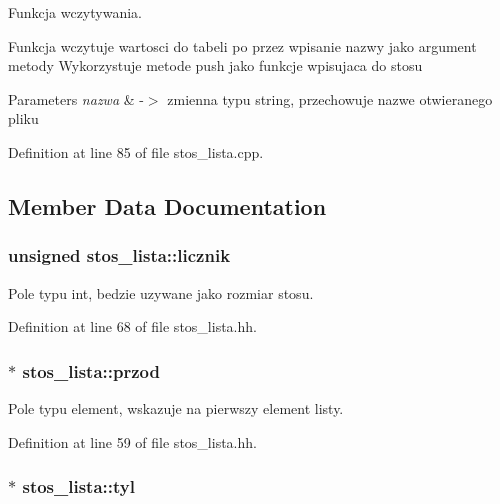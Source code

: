 Funkcja wczytywania. 

Funkcja wczytuje wartosci do tabeli po przez wpisanie nazwy jako argument metody Wykorzystuje metode push jako funkcje wpisujaca do stosu


\begin{DoxyParams}{Parameters}
{\em nazwa} & -\/$>$ zmienna typu string, przechowuje nazwe otwieranego pliku \\
\hline
\end{DoxyParams}


Definition at line 85 of file stos\-\_\-lista.\-cpp.



\subsection{Member Data Documentation}
\hypertarget{classstos__lista_ab9d47f55d1288d44e0b58fcea281925f}{
\subsubsection[{licznik}]{\setlength{\rightskip}{0pt plus 5cm}unsigned stos\-\_\-lista\-::licznik\hspace{0.3cm}{\ttfamily [private]}}}\label{classstos__lista_ab9d47f55d1288d44e0b58fcea281925f}


Pole typu int, bedzie uzywane jako rozmiar stosu. 



Definition at line 68 of file stos\-\_\-lista.\-hh.

\hypertarget{classstos__lista_ad9cd66242f8b8342bb3d8cb5852f58c5}{
\subsubsection[{przod}]{$\ast$ stos\-\_\-lista\-::przod\hspace{0.3cm}{\ttfamily [private]}}}\label{classstos__lista_ad9cd66242f8b8342bb3d8cb5852f58c5}


Pole typu element, wskazuje na pierwszy element listy. 



Definition at line 59 of file stos\-\_\-lista.\-hh.

\hypertarget{classstos__lista_af724a08b1601250dfc1a333430be9515}{
\subsubsection[{tyl}]{$\ast$ stos\-\_\-lista\-::tyl\hspace{0.3cm}{\ttfamily [private]}}}\label{classstos__lista_af724a08b1601250dfc1a333430be9515}


